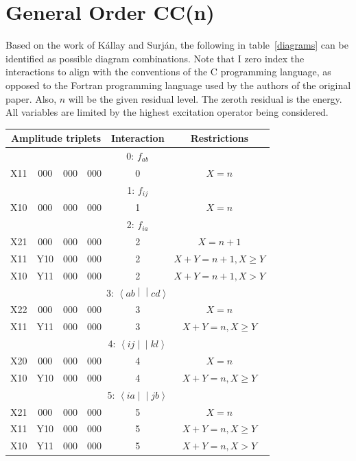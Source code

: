 \documentclass{article}
\newcommand{\tei}[2]{\left<{#1}\middle|\middle|{#2}\right>}
\begin{document}
\section{General Order CC(n)}

Based on the work of K\'allay and Surj\'an, the following in table~\ref{diagrams} can be identified as possible diagram combinations. Note that I zero index the interactions to align with the conventions of the C programming language, as opposed to the Fortran programming language used by the authors of the original paper. Also, $n$ will be the given residual level. The zeroth residual is the energy. All variables are limited by the highest excitation operator being considered.

  \begin{longtable}{cccccc}
    \multicolumn{4}{c}{Amplitude triplets} & Interaction & Restrictions\\
    \hline
    \multicolumn{6}{c}{0: $f_{ab}$}\\
    \hline
    X11 & 000 & 000 & 000 & 0 & $X = n$\\
    \hline
    \multicolumn{6}{c}{1: $f_{ij}$}\\
    \hline
    X10 & 000 & 000 & 000 & 1 & $X = n$\\
    \hline
    \multicolumn{6}{c}{2: $f_{ia}$}\\
    \hline
    X21 & 000 & 000 & 000 & 2 & $X = n + 1$\\
    X11 & Y10 & 000 & 000 & 2 & $X + Y = n + 1, X \ge Y$\\
    X10 & Y11 & 000 & 000 & 2 & $X + Y = n + 1, X > Y$\\
    \hline
    \multicolumn{6}{c}{3: $\tei{ab}{cd}$}\\
    \hline
    X22 & 000 & 000 & 000 & 3 & $X = n$\\
    X11 & Y11 & 000 & 000 & 3 & $X + Y = n, X \ge Y$\\
    \hline
    \multicolumn{6}{c}{4: $\tei{ij}{kl}$}\\
    \hline
    X20 & 000 & 000 & 000 & 4 & $X = n$\\
    X10 & Y10 & 000 & 000 & 4 & $X + Y = n, X\ge Y$\\
    \hline
    \multicolumn{6}{c}{5: $\tei{ia}{jb}$}\\
    \hline
    X21 & 000 & 000 & 000 & 5 & $X = n$\\
    X11 & Y10 & 000 & 000 & 5 & $X + Y = n, X \ge Y$\\
    X10 & Y11 & 000 & 000 & 5 & $X + Y = n, X > Y$\\

\end{longtable}
\end{document}
